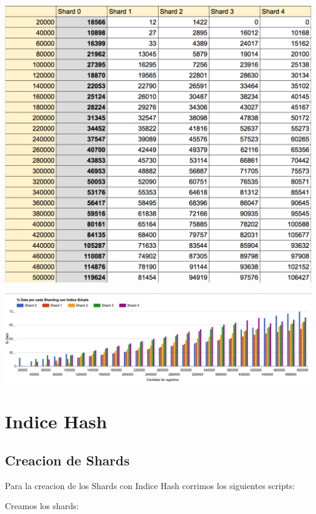 \documentclass[a4paper, 10pt, twoside]{article}
\begin{document}
\begin{center}
\includegraphics[scale=0.6]{tabla_indice.png}
\end{center}
\includegraphics[scale=0.4]{grafico_indice.png}

\section{Indice Hash}

\subsection{Creacion de Shards}

Para la creacion de los Shards con Indice Hash corrimos los siguientes scripts:

Creamos los shards:
\end{document}
